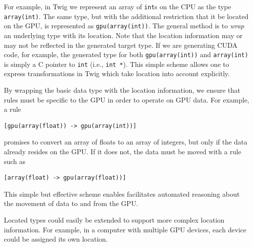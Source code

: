 For example, in Twig we represent an array of \texttt{int}s on the CPU as the
type \texttt{array(int)}. The same type, but with the additional restriction
that it be located on the GPU, is represented as \texttt{gpu(array(int))}. The
general method is to \emph{wrap} an underlying type with its location. Note that
the location information may or may not be reflected in the generated target
type. If we are generating CUDA code, for example, the generated type for both
\texttt{gpu(array(int))} and \texttt{array(int)} is simply a C pointer to
\texttt{int} (i.e., \texttt{int *}). This simple scheme allows one to express
transformations in Twig which take location into account explicitly.


By wrapping the basic data type with the location information, we ensure that
rules must be specific to the GPU in order to operate on GPU data. For example,
a rule

\begin{verbatim}
[gpu(array(float)) -> gpu(array(int))]
\end{verbatim}

promises to convert an array of floats to an array of integers, but only if the
data already resides on the GPU. If it does not, the data must be moved with a
rule such as

\begin{verbatim}
[array(float) -> gpu(array(float))]
\end{verbatim}

This simple but effective scheme enables facilitates automated reasoning about
the movement of data to and from the GPU.

Located types could easily be extended to support more complex location
information. For example, in a computer with multiple GPU devices, each device
could be assigned its own location.
